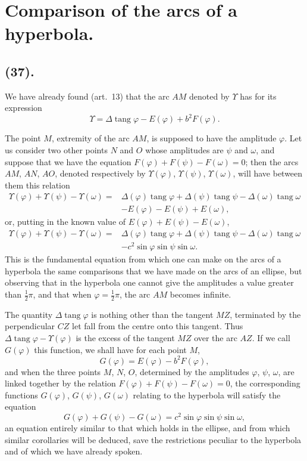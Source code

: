 \documentclass{article}
\begin{document}
\section*{Comparison of the arcs of a hyperbola.}

\subsection*{(37).}

We have already found (art.~13) that the arc $AM$ denoted by $\Upsilon$ has for its expression
\[ \Upsilon=\Delta\operatorname{tang}\varphi-E(\varphi)+b^{2}F(\varphi). \]

The point $M$, extremity of the arc $AM$, is supposed to have the amplitude $\varphi$. Let us consider two other points $N$ and $O$ whose amplitudes are $\psi$ and $\omega$, and suppose that we have the equation $F(\varphi)+F(\psi)-F(\omega)=0$; then the arcs $AM$, $AN$, $AO$, denoted respectively by $\Upsilon(\varphi)$, $\Upsilon(\psi)$, $\Upsilon(\omega)$, will have between them this relation
\[ \begin{aligned} \Upsilon(\varphi)+\Upsilon(\psi)-\Upsilon(\omega)={}&\Delta(\varphi)\operatorname{tang}\varphi+\Delta(\psi)\operatorname{tang}\psi-\Delta(\omega)\operatorname{tang}\omega\\ &-E(\varphi)-E(\psi)+E(\omega), \end{aligned} \]
or, putting in the known value of $E(\varphi)+E(\psi)-E(\omega)$,
\[ \begin{aligned} \Upsilon(\varphi)+\Upsilon(\psi)-\Upsilon(\omega)={}&\Delta(\varphi)\operatorname{tang}\varphi+\Delta(\psi)\operatorname{tang}\psi-\Delta(\omega)\operatorname{tang}\omega\\ &-c^{2}\sin\varphi\sin\psi\sin\omega. \end{aligned} \]
This is the fundamental equation from which one can make on the arcs of a hyperbola the same comparisons that we have made on the arcs of an ellipse, but observing that in the hyperbola one cannot give the amplitudes a value greater than $\frac{1}{2}\pi$, and that when $\varphi=\frac{1}{2}\pi$, the arc $AM$ becomes infinite.

The quantity $\Delta\operatorname{tang}\varphi$ is nothing other than the tangent $MZ$, terminated by the perpendicular $CZ$ let fall from the centre onto this tangent. Thus $\Delta\operatorname{tang}\varphi-\Upsilon(\varphi)$ is the excess of the tangent $MZ$ over the arc $AZ$. If we call $G(\varphi)$ this function, we shall have for each point $M$,
\[ G(\varphi)=E(\varphi)-b^{2}F(\varphi), \]
and when the three points $M$, $N$, $O$, determined by the amplitudes $\varphi$, $\psi$, $\omega$, are linked together by the relation $F(\varphi)+F(\psi)-F(\omega)=0$, the corresponding functions $G(\varphi)$, $G(\psi)$, $G(\omega)$ relating to the hyperbola will satisfy the equation
\[ G(\varphi)+G(\psi)-G(\omega)=c^{2}\sin\varphi\sin\psi\sin\omega, \]
an equation entirely similar to that which holds in the ellipse, and from which similar corollaries will be deduced, save the restrictions peculiar to the hyperbola and of which we have already spoken.
\end{document}
